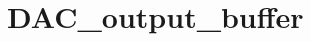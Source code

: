 \hypertarget{group___d_a_c__output__buffer}{\section{D\-A\-C\-\_\-output\-\_\-buffer}
\label{group___d_a_c__output__buffer}
}
